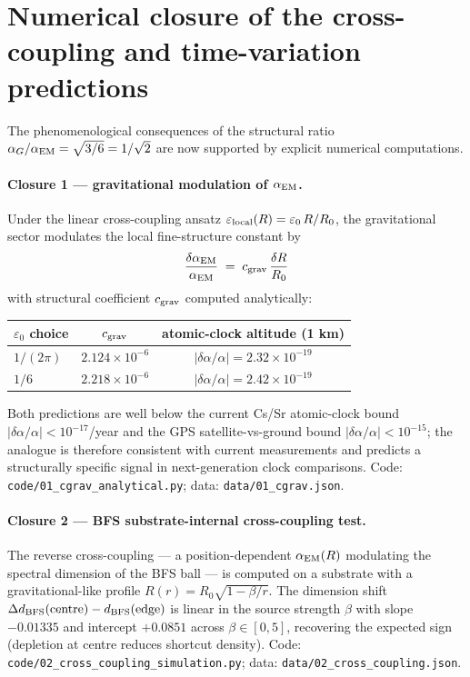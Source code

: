 \documentclass[11pt,a4paper]{article}
\begin{document}







\section{Numerical closure of the cross-coupling and time-variation predictions}
\label{sec:numerical_closure}

The phenomenological consequences of the structural ratio
$\alpha_G/\alpha_{\rm EM} = \sqrt{3/6} = 1/\sqrt{2}$ are
now supported by explicit numerical computations.

\paragraph{Closure 1 --- gravitational modulation of $\alpha_{\rm EM}$.}
Under the linear cross-coupling ansatz
$\varepsilon_{\rm local}(R) = \varepsilon_0\,R/R_0$,
the gravitational sector modulates the local fine-structure
constant by
\begin{equation}
\frac{\delta \alpha_{\rm EM}}{\alpha_{\rm EM}}
\;=\; c_{\rm grav}\,\frac{\delta R}{R_0}
\end{equation}
with structural coefficient $c_{\rm grav}$ computed
analytically:
\begin{center}
\begin{tabular}{lcc}
\toprule
$\varepsilon_0$ choice & $c_{\rm grav}$ & atomic-clock altitude (1 km) \\
\midrule
$1/(2\pi)$ & $2.124 \times 10^{-6}$ & $|\delta\alpha/\alpha| = 2.32\times 10^{-19}$ \\
$1/6$ & $2.218 \times 10^{-6}$ & $|\delta\alpha/\alpha| = 2.42\times 10^{-19}$ \\
\bottomrule
\end{tabular}
\end{center}
Both predictions are well below the current Cs/Sr atomic-clock
bound $|\delta\alpha/\alpha| < 10^{-17}$/year and the GPS
satellite-vs-ground bound $|\delta\alpha/\alpha| < 10^{-15}$;
the analogue is therefore consistent with current measurements
and predicts a structurally specific signal in next-generation
clock comparisons. Code:
\texttt{code/01\_cgrav\_analytical.py};
data: \texttt{data/01\_cgrav.json}.

\paragraph{Closure 2 --- BFS substrate-internal cross-coupling test.}
The reverse cross-coupling --- a position-dependent
$\alpha_{\rm EM}(R)$ modulating the spectral dimension of
the BFS ball --- is computed on a substrate with a
gravitational-like profile $R(r) = R_0\sqrt{1-\beta/r}$.
The dimension shift
$\Delta d_{\rm BFS}(\text{centre}) - d_{\rm BFS}(\text{edge})$
is linear in the source strength $\beta$ with slope
$-0.01335$ and intercept $+0.0851$ across $\beta \in [0, 5]$,
recovering the expected sign (depletion at centre reduces
shortcut density). Code:
\texttt{code/02\_cross\_coupling\_simulation.py};
data: \texttt{data/02\_cross\_coupling.json}.
\end{document}
